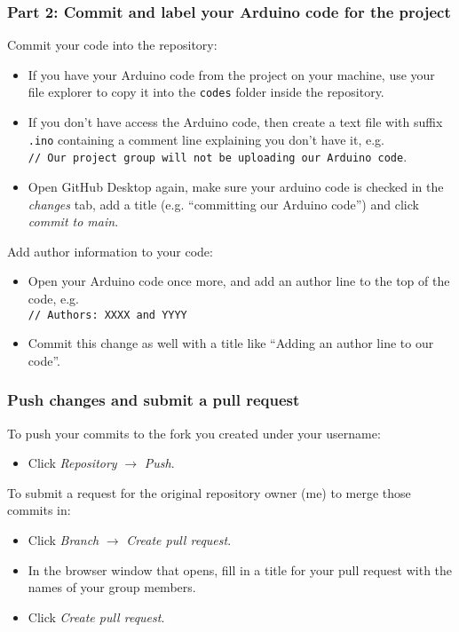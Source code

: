 \documentclass[
8pt,
]{beamer}
\begin{document}
\begin{frame}
  \frametitle{Part 2: Commit and label your Arduino code for the project}
  Commit your code into the repository:
  \begin{itemize}
    \item If you have your Arduino code from the project on your machine, use your file explorer to copy it into the \texttt{codes} folder inside the repository.
    \item If you don't have access the Arduino code, then create a text file with suffix \texttt{.ino} containing a comment line explaining you don't have it, e.g. \\ \texttt{// Our project group will not be uploading our Arduino code}.
    \item Open GitHub Desktop again, make sure your arduino code is checked in the \emph{changes} tab, add a title (e.g. ``committing our Arduino code'') and click \emph{commit to main}.
  \end{itemize}
  \vspace*{\baselineskip}
  Add author information to your code:
  \begin{itemize}
    \item Open your Arduino code once more, and add an author line to the top of the code, e.g. \\ \texttt{// Authors: XXXX and YYYY}
    \item Commit this change as well with a title like ``Adding an author line to our code''.
  \end{itemize}
\end{frame}
%
\begin{frame}
  \frametitle{Push changes and submit a pull request}
  To push your commits to the fork you created under your username:
  \begin{itemize}
    \item Click \emph{Repository} $\rightarrow$ \emph{Push}.
  \end{itemize}
  To submit a request for the original repository owner (me) to merge those commits in:
  \begin{itemize}
    \item Click \emph{Branch} $\rightarrow$ \emph{Create pull request}.
    \item In the browser window that opens, fill in a title for your pull request with the names of your group members.
    \item Click \emph{Create pull request}.
  \end{itemize}
\end{frame}
%
\end{document}
